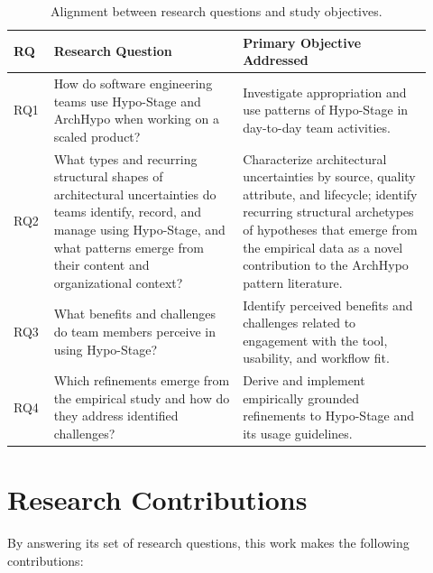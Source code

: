 \begin{table}[htbp]
\centering
\caption{Alignment between research questions and study objectives.}
\label{tab:rq-objectives}
\begin{tabular}{p{0.08\linewidth} p{0.42\linewidth} p{0.42\linewidth}}
\toprule
\textbf{RQ} & \textbf{Research Question} & \textbf{Primary Objective Addressed} \\
\midrule
RQ1 & How do software engineering teams use Hypo-Stage and ArchHypo when working on a scaled product? & Investigate appropriation and use patterns of Hypo-Stage in day-to-day team activities. \\
\midrule
RQ2 & What types and recurring structural shapes of architectural uncertainties do teams identify, record, and manage using Hypo-Stage, and what patterns emerge from their content and organizational context? & Characterize architectural uncertainties by source, quality attribute, and lifecycle; identify recurring structural archetypes of hypotheses that emerge from the empirical data as a novel contribution to the ArchHypo pattern literature. \\
\midrule
RQ3 & What benefits and challenges do team members perceive in using Hypo-Stage? & Identify perceived benefits and challenges related to engagement with the tool, usability, and workflow fit. \\
\midrule
RQ4 & Which refinements emerge from the empirical study and how do they address identified challenges? & Derive and implement empirically grounded refinements to Hypo-Stage and its usage guidelines. \\
\bottomrule
\end{tabular}
\end{table}

\section{Research Contributions}

By answering its set of research questions, this work makes the following contributions:

